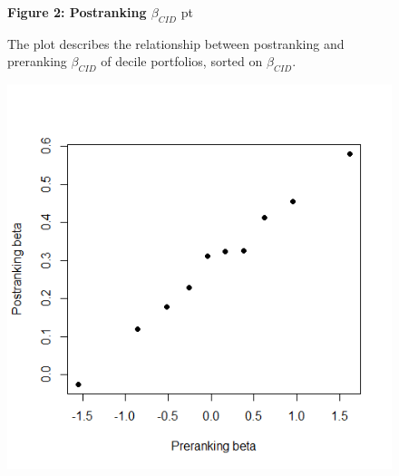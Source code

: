\documentclass[12pt]{article}
\begin{document}
\begin{figure}
\textbf{Figure 2: Postranking $\beta_{CID}$}
 pt
\begin{flushleft}
{The plot describes the relationship between postranking and preranking $\beta_{CID}$ of decile portfolios, sorted on $\beta_{CID}$.}
\end{flushleft}
\centering
\includegraphics[width=1\textwidth]{Figure2.png}
\end{figure}
\end{document}
